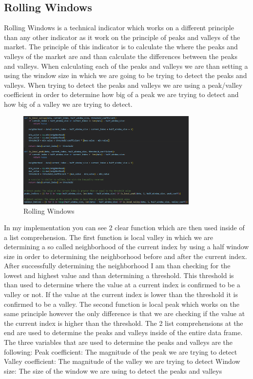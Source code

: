 \documentclass{imc-inf}
\begin{document}
	\subsection{Rolling Windows}
	Rolling Windows is a technical indicator which works on a different principle than any other indicator as it work on the principle of peaks and valleys of the market.
	The principle of this indicator is to calculate the where the peaks and valleys of the market are and than calculate the differences between the peaks and valleys.
	When calculating each of the peaks and valleys we are than setting a using the window size in which we are going to be trying to detect the peaks and valleys.
	When trying to detect the peaks and valleys we are using a peak/valley coefficient in order to determine how big of a peak we are trying to detect and how big of a valley we are trying to detect.
	\begin{figure}[h!]
		\centering
		\includegraphics[width=0.8\textwidth]{rolling_windows_code.png}
		\caption{Rolling Windows}
		\label{fig:rolling_windows}
		
	\end{figure}
	In my implementation you can see 2 clear function which are then used inside of a list comprehension. The first function is local valley in which 
	we are determining a so called neighborhood of the current index by using a half window size in order to determining the neighborhood before and after the current index.
	After successfully determining the neighborhood I am than checking for the lowest and highest value and than determining a threshold. This threshold is than used to determine
	where the value at a current index is confirmed to be a valley or not. If the value at the current index is lower than the threshold it is confirmed to be a valley.
	The second function is local peak which works on the same principle however the only difference is that we are checking if the value at the current index is higher than the threshold.
	The 2 list comprehensions at the end are used to determine the peaks and valleys inside of the entire data frame.
	The three variables that are used to determine the peaks and valleys are the following:
	Peak coefficient: The magnitude of the peak we are trying to detect
	Valley coefficient: The magnitude of the valley we are trying to detect
	Window size: The size of the window we are using to detect the peaks and valleys
	
\end{document}
